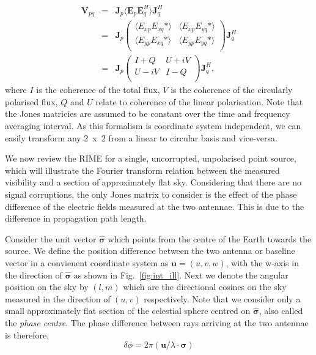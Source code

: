 \begin{eqnarray}
\bm{V}_{pq} &= & \bm{J}_p \langle {\bm E}_p  {\bm E}_q^H \rangle \bm{J}_q^H \\
&=&  \bm{J}_p\left(
\begin{array}{cc}
\langle E_{xp} E_{xq}* \rangle & \langle E_{xp} E_{yq}* \rangle \\
\langle E_{yp} E_{xq}* \rangle & \langle E_{yp} E_{yq}* \rangle \\
\end{array} 
\right) \bm{J}_q^H \\ 
&=&
 \bm{J}_p \left(
\begin{array}{cc}
I+Q & U +iV\\
U-iV & I-Q \\
\end{array}
\right)\bm{J}_q^H,
\end{eqnarray}
where $I$ is the coherence of the total flux, $V$ is the coherence of the circularly polarised flux, $Q$ and $U$ relate to coherence of the linear polarisation. Note that the Jones matricies are assumed to be constant over the time and frequency averaging interval. As this formalism is coordinate system independent, we can easily transform any 2~x~2 from a linear to circular basis and vice-versa. 

We now review the RIME for a single, uncorrupted, unpolarised point source, which will illustrate the Fourier transform relation between the measured visibility and a section of approximately flat sky.
Considering that there are no signal corruptions, the only Jones matrix to consider is the effect of the phase difference of the electric fields measured at the two antennae. This is due to the difference in propagation path length.


Consider the unit vector $\hat{\bm{\sigma}}$ which points from the centre of the Earth towards the source. We define the position difference between the two antenna or baseline vector in a convienent coordinate system as $\bm{u} = (u,v,w)$,  with the w-axis in the direction of $\hat{\bm{\sigma}}$ as shown in Fig.~\ref{fig:int_ill}. Next we denote the angular position on the sky by $(l, m)$ which are the directional cosines on the sky measured in the direction of $(u, v)$ respectively. Note that we consider only a small approximately flat section of the celestial sphere centred on $\hat{\bm{\sigma}}$, also called the \emph{phase centre}. The phase difference between rays arriving at the two antennae is therefore,
\begin{equation}
 \delta \phi = 2\pi (\bm{u}/\lambda \cdot \bm{\sigma})
\end{equation}

